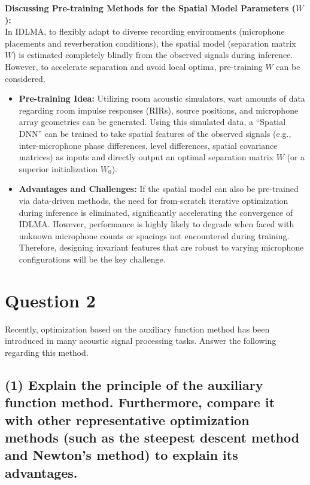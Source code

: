 \documentclass[12pt,a4paper]{article}
\begin{document}
\vspace{1em}
\noindent \textbf{Discussing Pre-training Methods for the Spatial Model Parameters ($W$):} \\
In IDLMA, to flexibly adapt to diverse recording environments (microphone placements and reverberation conditions), the spatial model (separation matrix $W$) is estimated completely blindly from the observed signals during inference. However, to accelerate separation and avoid local optima, pre-training $W$ can be considered.
\begin{itemize}
    \item \textbf{Pre-training Idea:} Utilizing room acoustic simulators, vast amounts of data regarding room impulse responses (RIRs), source positions, and microphone array geometries can be generated. Using this simulated data, a ``Spatial DNN'' can be trained to take spatial features of the observed signals (e.g., inter-microphone phase differences, level differences, spatial covariance matrices) as inputs and directly output an optimal separation matrix $W$ (or a superior initialization $W_0$).
    \item \textbf{Advantages and Challenges:} If the spatial model can also be pre-trained via data-driven methods, the need for from-scratch iterative optimization during inference is eliminated, significantly accelerating the convergence of IDLMA. However, performance is highly likely to degrade when faced with unknown microphone counts or spacings not encountered during training. Therefore, designing invariant features that are robust to varying microphone configurations will be the key challenge.
\end{itemize}

\newpage
\section*{Question 2}
Recently, optimization based on the auxiliary function method has been introduced in many acoustic signal processing tasks. Answer the following regarding this method.

\subsection*{(1) Explain the principle of the auxiliary function method. Furthermore, compare it with other representative optimization methods (such as the steepest descent method and Newton's method) to explain its advantages.}
\end{document}
